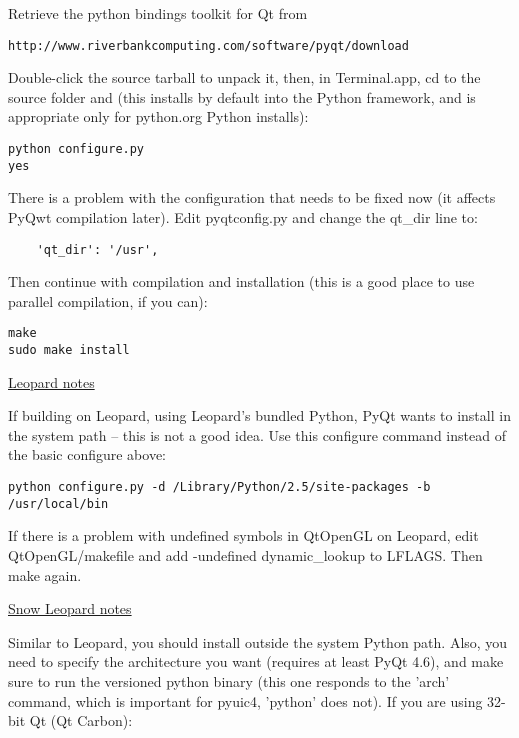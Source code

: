 Retrieve the python bindings toolkit for Qt from

\begin{verbatim}
http://www.riverbankcomputing.com/software/pyqt/download
\end{verbatim}

Double-click the source tarball to unpack it, then, in Terminal.app, cd to the source folder
and (this installs by default into the Python framework, and is appropriate only for
python.org Python installs):

\begin{verbatim}
python configure.py 
yes 
\end{verbatim}

There is a problem with the configuration that needs to be fixed now
(it affects PyQwt compilation later).  Edit pyqtconfig.py and change the qt\_dir line to:

\begin{verbatim}
    'qt_dir': '/usr',
\end{verbatim}

Then continue with compilation and installation (this is a good place to use
parallel compilation, if you can):

\begin{verbatim}
make 
sudo make install 
\end{verbatim}

\underline{Leopard notes}

If building on Leopard, using Leopard's bundled Python, PyQt wants to install
in the system path -- this is not a good idea.  Use this configure command
instead of the basic configure above:

\begin{verbatim}
python configure.py -d /Library/Python/2.5/site-packages -b /usr/local/bin
\end{verbatim}

If there is a problem with undefined symbols in QtOpenGL on Leopard, edit
QtOpenGL/makefile and add -undefined dynamic\_lookup to LFLAGS.
Then make again.

\underline{Snow Leopard notes}

Similar to Leopard, you should install outside the system Python path.
Also, you need to specify the architecture you want (requires at least PyQt 4.6),
and make sure to run the versioned python binary (this one responds to the
'arch' command, which is important for pyuic4, 'python' does not).
If you are using 32-bit Qt (Qt Carbon):

